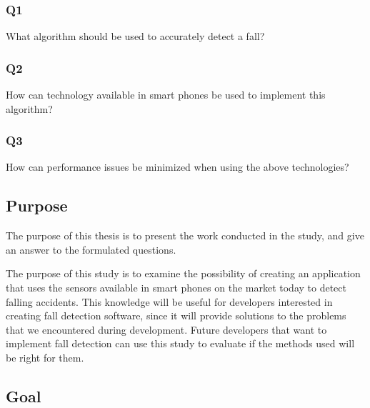 \documentclass[12pt, a4paper, onecolumn]{article}
\begin{document}
		\subsubsection{Q1}
		What algorithm should be used to accurately detect a fall?
		
		\subsubsection{Q2}
		How can technology available in smart phones be used to implement this algorithm?
		
		\subsubsection{Q3}
		How can performance issues be minimized when using the above technologies?
		
		\subsection{Purpose}
		
		The purpose of this thesis is to present the work conducted in the study, and give an answer to the formulated questions.
		
		The purpose of this study is to examine the possibility of creating an application that uses the sensors available in smart phones on the market today to detect falling accidents. This knowledge will be useful for developers interested in creating fall detection software, since it will provide solutions to the problems that we encountered during development. Future developers that want to implement fall detection can use this study to evaluate if the methods used will be right for them.
		
		\subsection{Goal}
		
\end{document}
